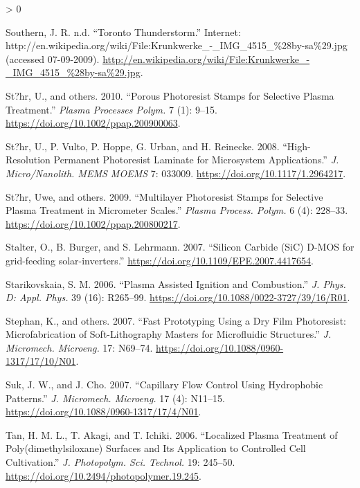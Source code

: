 \documentclass[
  10pt,
  twoside]{article}
\newlength{\cslhangindent}
\newenvironment{CSLReferences}[2] %
 {%
  \setlength{\parindent}{0pt}
  \ifodd #1 \everypar{\setlength{\hangindent}{\cslhangindent}}\ignorespaces\fi
  \ifnum #2 > 0
  \setlength{\parskip}{#2\baselineskip}
  \fi
 }%
 {}
\begin{document}
\begin{CSLReferences}{1}{0}
\leavevmode\hypertarget{ref-Lightning}{}%
Southern, J. R. n.d. {``Toronto Thunderstorm.''} Internet: {}http://en.wikipedia.org/wiki/File:Krunkwerke\_-\_IMG\_4515\_\%28by-sa\%29.jpg (accessed 07-09-2009). \url{http://en.wikipedia.org/wiki/File:Krunkwerke_-_IMG_4515_\%28by-sa\%29.jpg}.

\leavevmode\hypertarget{ref-Stoe10}{}%
St?hr, U., and others. 2010. {``Porous Photoresist Stamps for Selective Plasma Treatment.''} \emph{Plasma Processes Polym.} 7 (1): 9--15. \url{https://doi.org/10.1002/ppap.200900063}.

\leavevmode\hypertarget{ref-Stoe08}{}%
St?hr, U., P. Vulto, P. Hoppe, G. Urban, and H. Reinecke. 2008. {``High-Resolution Permanent Photoresist Laminate for Microsystem Applications.''} \emph{J. Micro/Nanolith. MEMS MOEMS} 7: 033009. \url{https://doi.org/10.1117/1.2964217}.

\leavevmode\hypertarget{ref-Stoe09}{}%
St?hr, Uwe, and others. 2009. {``Multilayer Photoresist Stamps for Selective Plasma Treatment in Micrometer Scales.''} \emph{Plasma Process. Polym.} 6 (4): 228--33. \url{https://doi.org/10.1002/ppap.200800217}.

\leavevmode\hypertarget{ref-Stal07}{}%
Stalter, O., B. Burger, and S. Lehrmann. 2007. {``{Silicon Carbide (SiC) D-MOS for grid-feeding solar-inverters}.''} \url{https://doi.org/10.1109/EPE.2007.4417654}.

\leavevmode\hypertarget{ref-Star06}{}%
Starikovskaia, S. M. 2006. {``Plasma Assisted Ignition and Combustion.''} \emph{J. Phys. D: Appl. Phys.} 39 (16): R265--99. \url{https://doi.org/10.1088/0022-3727/39/16/R01}.

\leavevmode\hypertarget{ref-Step07}{}%
Stephan, K., and others. 2007. {``Fast Prototyping Using a Dry Film Photoresist: Microfabrication of Soft-Lithography Masters for Microfluidic Structures.''} \emph{J. Micromech. Microeng.} 17: N69--74. \url{https://doi.org/10.1088/0960-1317/17/10/N01}.

\leavevmode\hypertarget{ref-Suk07}{}%
Suk, J. W., and J. Cho. 2007. {``Capillary Flow Control Using Hydrophobic Patterns.''} \emph{J. Micromech. Microeng.} 17 (4): N11--15. \url{https://doi.org/10.1088/0960-1317/17/4/N01}.

\leavevmode\hypertarget{ref-Tan06}{}%
Tan, H. M. L., T. Akagi, and T. Ichiki. 2006. {``Localized Plasma Treatment of Poly(dimethylsiloxane) Surfaces and Its Application to Controlled Cell Cultivation.''} \emph{J. Photopolym. Sci. Technol.} 19: 245--50. \url{https://doi.org/10.2494/photopolymer.19.245}.


\end{CSLReferences}
\end{document}
